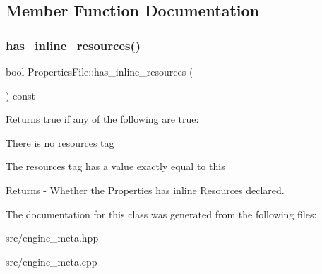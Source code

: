 \subsection{Member Function Documentation}
\mbox{\label{class_properties_file_a9d0632fbdef9f881c065b49d0b4bc7e9}} 
\subsubsection{\texorpdfstring{has\+\_\+inline\+\_\+resources()}{has\_inline\_resources()}}
{\footnotesize\ttfamily bool Properties\+File\+::has\+\_\+inline\+\_\+resources (\begin{DoxyParamCaption}{ }\end{DoxyParamCaption}) const}

Returns true if any of the following are true\+:
\begin{DoxyItemize}
\item There is no \textquotesingle{}resources\textquotesingle{} tag
\item The \textquotesingle{}resources\textquotesingle{} tag has a value exactly equal to \textquotesingle{}this\textquotesingle{} \begin{DoxyReturn}{Returns}
-\/ Whether the Properties has inline Resources declared. 
\end{DoxyReturn}

\end{DoxyItemize}

The documentation for this class was generated from the following files\+:\begin{DoxyCompactItemize}
\item 
src/engine\+\_\+meta.\+hpp\item 
src/engine\+\_\+meta.\+cpp\end{DoxyCompactItemize}
